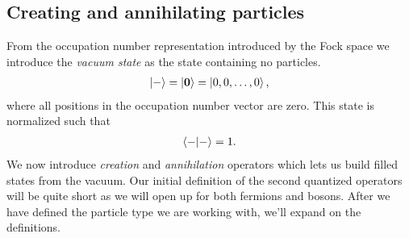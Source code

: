 

        \subsection{Creating and annihilating particles}
            From the occupation number representation introduced by the Fock
            space we introduce the \emph{vacuum state} as the state containing
            no particles.
            \begin{align}
                \ket{-} = \ket{\boldsymbol{0}} = \ket{0, 0, \dots, 0},
            \end{align}
            where all positions in the occupation number vector are zero.
            This state is normalized such that
            \begin{align}
                \braket{-} = 1.
            \end{align}
            We now introduce \emph{creation} and \emph{annihilation} operators
            which lets us build filled states from the vacuum.
            Our initial definition of the second quantized operators will be
            quite short as we will open up for both fermions and bosons.
            After we have defined the particle type we are working with, we'll
            expand on the definitions.

